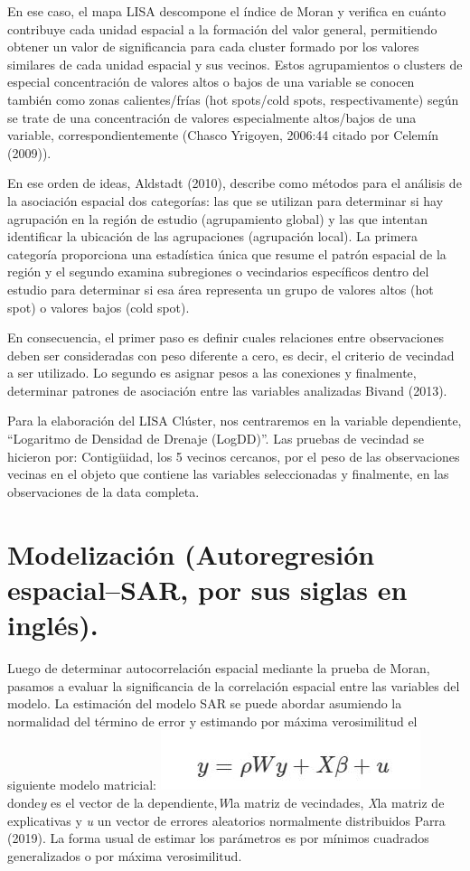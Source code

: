 \documentclass[11pt,]{article}
\begin{document}
En ese caso, el mapa LISA descompone el índice de Moran y verifica en
cuánto contribuye cada unidad espacial a la formación del valor general,
permitiendo obtener un valor de significancia para cada cluster formado
por los valores similares de cada unidad espacial y sus vecinos. Estos
agrupamientos o clusters de especial concentración de valores altos o
bajos de una variable se conocen también como zonas calientes/frías (hot
spots/cold spots, respectivamente) según se trate de una concentración
de valores especialmente altos/bajos de una variable,
correspondientemente (Chasco Yrigoyen, 2006:44 citado por Celemín
(2009)).

En ese orden de ideas, Aldstadt (2010), describe como métodos para el
análisis de la asociación espacial dos categorías: las que se utilizan
para determinar si hay agrupación en la región de estudio (agrupamiento
global) y las que intentan identificar la ubicación de las agrupaciones
(agrupación local). La primera categoría proporciona una estadística
única que resume el patrón espacial de la región y el segundo examina
subregiones o vecindarios específicos dentro del estudio para determinar
si esa área representa un grupo de valores altos (hot spot) o valores
bajos (cold spot).

En consecuencia, el primer paso es definir cuales relaciones entre
observaciones deben ser consideradas con peso diferente a cero, es
decir, el criterio de vecindad a ser utilizado. Lo segundo es asignar
pesos a las conexiones y finalmente, determinar patrones de asociación
entre las variables analizadas Bivand (2013).

Para la elaboración del LISA Clúster, nos centraremos en la variable
dependiente, ``Logaritmo de Densidad de Drenaje (LogDD)''. Las pruebas
de vecindad se hicieron por: Contigüidad, los 5 vecinos cercanos, por el
peso de las observaciones vecinas en el objeto que contiene las
variables seleccionadas y finalmente, en las observaciones de la data
completa.

\section{Modelización (Autoregresión espacial--SAR, por sus siglas en
inglés).}\label{modelizaciuxf3n-autoregresiuxf3n-espacialsar-por-sus-siglas-en-ingluxe9s.}

Luego de determinar autocorrelación espacial mediante la prueba de
Moran, pasamos a evaluar la significancia de la correlación espacial
entre las variables del modelo. La estimación del modelo SAR se puede
abordar asumiendo la normalidad del término de error y estimando por
máxima verosimilitud el siguiente modelo matricial:
\includegraphics{Imagenes/modeloSAR.JPG} donde\emph{y} es el vector de
la dependiente,\emph{W}la matriz de vecindades, \emph{X}la matriz de
explicativas y \emph{u} un vector de errores aleatorios normalmente
distribuidos Parra (2019). La forma usual de estimar los parámetros es
por mínimos cuadrados generalizados o por máxima verosimilitud.
\end{document}
